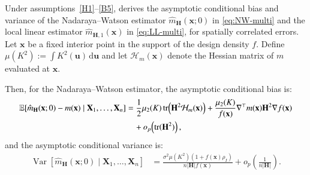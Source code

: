 \documentclass[12pt]{report} %
\newcommand{\bH}{\mathbf{H}}
\newcommand{\bX}{\mathbf{X}}
\newcommand{\bx}{\mathbf{x}}
\newcommand{\bu}{\boldsymbol{u}}
\newcommand{\rd}{\mathrm{d}}
\begin{document}
Under assumptions~\ref{H1}--\ref{B5}, \citet{Liu2001} derives the asymptotic conditional bias and variance of the Nadaraya--Watson estimator $\hat{m}_{\bH}(\bx;0)$ in \eqref{eq:NW-multi} and the local linear estimator $\hat{m}_{\bH,1} (\bx)$ in \eqref{eq:LL-multi}, for spatially correlated errors. Let $\bx$ be a fixed interior point in the support of the design density $f$. Define $\mu(K^2):=\int K^2(\bu)\,\rd\bu$ and let $\mathcal{H}_m(\bx)$ denote the Hessian matrix of $m$ evaluated at $\bx$.

Then, for the Nadaraya--Watson estimator, the asymptotic conditional bias is:
\begin{align}
    \label{eq:nw-bias-correlated}
    \mathbb{E}\!\left[\hat{m}_{\bH}(\bx;0)-m(\bx) \mid \bX_1,\ldots,\bX_n \right]
    &= \frac{1}{2}\mu_2(K) \operatorname{tr}\!\left(\bH^2\mathcal{H}_m(\bx)\right)
    + \frac{\mu_2(K)}{f(\bx)} \nabla^\top m(\bx)\bH^2\nabla f(\bx) \notag \\ 
    & \quad + o_p\!\left(\operatorname{tr}(\bH^2)\right),
\end{align}
and the asymptotic conditional variance is: 
\begin{align}
    \label{eq:nw-variance-correlated}
    \operatorname{Var}\!\left[ \hat{m}_{\bH}(\bx;0) \mid \bX_1,\ldots,\bX_n\right] 
    &= \frac{\sigma^2\mu(K^2)\left(1+f(\bx)\rho_I\right)}{n|\bH|f(\bx)}+ o_p\!\left(\frac{1}{n|\bH|}\right).
\end{align}
\end{document}
